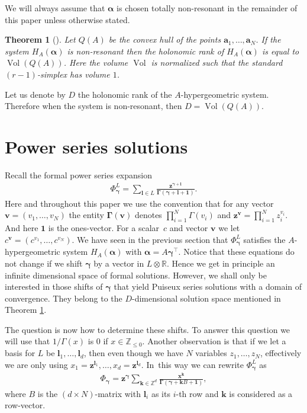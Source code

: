 \documentclass[11pt]{article}
\numberwithin{equation}{section}
\DeclareMathOperator*{\Vol}{Vol}
\numberwithin{equation}{section}
\newtheorem{Theorem}{Theorem}[section]
\begin{document}
We will always assume that $\bm{\alpha}$ is chosen totally non-resonant in the remainder of this paper unless otherwise stated.

\begin{Theorem}[{\cite[Corollary 5.20]{Ado94}}]\label{thm:A-rank}
Let $Q(A)$ be the convex hull of the points $\bm{a}_1,\dots,\bm{a}_N$. If the system $H_{A}(\bm{\alpha})$ is non-resonant then the holonomic rank of $H_{A}(\bm{\alpha})$ is equal to $\Vol(Q(A))$. Here the volume $\Vol$ is normalized such that the standard $(r-1)$-simplex has volume $1$.
\end{Theorem}
Let us denote by $D$ the holonomic rank of the $A$-hypergeometric system. Therefore when the system is non-resonant, then $D = \Vol(Q(A))$.


\section{Power series solutions}
\label{chap-power}
Recall the formal power series expansion
\begin{gather*}\Phi_{\bm{\gamma}}^L =
\sum_{\bm{l}\in L} \frac{\bm{z}^{\bm{\gamma} + \bm{l}}}{\bm{\Gamma}(\bm{\gamma} + \bm{l} + \bm{1}) }. %
\end{gather*}
Here and throughout this paper we use the convention that for any vector $\bm{v} = \left(v_1,\dots,v_N\right)$ the entity $\bm{\Gamma}(\bm{v})$ denotes $\prod_{i=1}^N \Gamma(v_i)$ and $\bm{z}^{\bm{v}} = \prod_{i=1}^N z_i^{v_i}$. And here $\bm{1}$ is the ones-vector. For a scalar~$c$ and vector $\bm{v}$ we let $c^{\bm{v}} = \left(c^{v_1},\dots,c^{v_N}\right)$.
We have seen in the previous section that $\Phi_{\bm{\gamma}}^L$ satisfies the $A$-hypergeometric system
$H_A(\bm\alpha)$ with $\bm\alpha=A\bm\gamma^\intercal$. Notice that these equations do
not change if we shift $\bm\gamma$ by a vector in $L\otimes\mathbb{R}$. Hence we get
in principle an infinite dimensional space of formal solutions. However, we shall only
be interested in those shifts of $\bm\gamma$ that yield Puiseux series solutions with
a domain of convergence. They belong to the $D$-dimensional solution space mentioned in
Theorem \ref{thm:A-rank}.

The question is now how to determine these shifts.
To answer this question we will use that $1/\Gamma(x)$ is $0$ if $x \in \mathbb{Z}_{\leq 0}$. Another observation is that if we let a basis for $L$ be $\bm{l}_1,\dots,\bm{l}_d$, then even though we have $N$ variables $z_1,\dots,z_N$, effectively we are only using
$x_1 = \bm{z}^{\bm{l}_1},\dots,x_d = \bm{z}^{\bm{l}_d}$. In~this way we can rewrite $\Phi_{\bm{\gamma}}^L$ as
\begin{gather*}
\Phi_{\bm{\gamma}} = \bm{z}^{\bm{\gamma}}\sum_{\bm{k} \in \mathbb{Z}^d} \frac{\bm{x}^{\bm{k}}}{\bm{\Gamma}(\bm{\gamma} + \bm{k}B + \bm{1}) },
\end{gather*}
where $B$ is the $(d\times N)$-matrix with $\bm{l}_i$ as its $i$-th row and $\bm{k}$ is considered as a row-vector.
\end{document}
